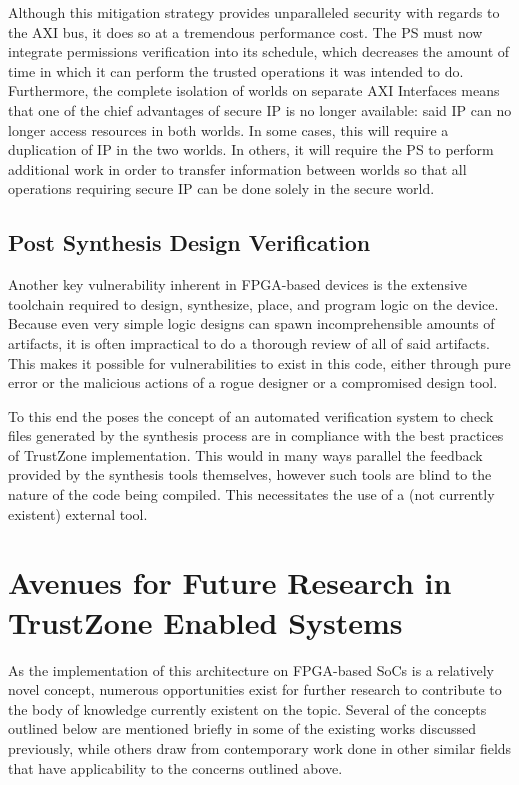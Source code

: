 \documentclass[journal]{IEEEtran}
\begin{document}
Although this mitigation strategy provides unparalleled security with regards to the AXI
bus, it does so at a tremendous performance cost. The PS must now integrate permissions 
verification into its schedule, which decreases the amount of time in which it can perform
the trusted operations it was intended to do. Furthermore, the complete isolation of
worlds on separate AXI Interfaces means that one of the chief advantages of secure IP is
no longer available: said IP can no longer access resources in both worlds. In some cases,
this will require a duplication of IP in the two worlds. In others, it will require the PS
to perform additional work in order to transfer information between worlds so that all
operations requiring secure IP can be done solely in the secure world.

\subsection{Post Synthesis Design Verification} \label{sec:Verification}
Another key vulnerability inherent in FPGA-based devices is the extensive toolchain
required to design, synthesize, place, and program logic on the device. Because even very
simple logic designs can spawn incomprehensible amounts of artifacts, it is often
impractical to do a thorough review of all of said artifacts. This makes it possible for
vulnerabilities to exist in this code, either through pure error or the malicious actions
of a rogue designer or a compromised design tool. 

To this end the \cite{benhani_security_2019} poses the concept of an automated
verification system to check files generated by the synthesis process are in compliance
with the best practices of TrustZone implementation. This would in many ways parallel the
feedback provided by the synthesis tools themselves, however such tools are blind to the
nature of the code being compiled. This necessitates the use of a (not currently existent)
external tool.

\section{Avenues for Future Research in TrustZone Enabled Systems} 
\label{sec:Further Research}
As the implementation of this architecture on FPGA-based SoCs is a relatively novel
concept, numerous opportunities exist for further research to contribute to the body of
knowledge currently existent on the topic. Several of the concepts outlined below are
mentioned briefly in some of the existing works discussed previously, while others draw
from contemporary work done in other similar fields that have applicability to the 
concerns outlined above.
\end{document}
